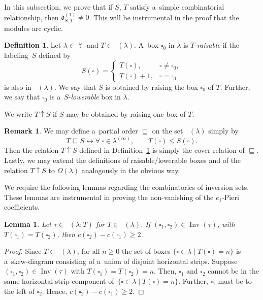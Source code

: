 \documentclass[10pt,a4paper]{amsart}
\numberwithin{equation}{section}
\newtheorem{Lemma}[Theorem]{Lemma}
\theoremstyle{definition}
\newtheorem{Definition}[Theorem]{Definition}
\newtheorem{Remark}[Theorem]{Remark}
\DeclareMathOperator{\Par}{\mathbb{Y}}
\DeclareMathOperator{\PSYT}{\mathrm{PSYT}_{\geq 0}}
\DeclareMathOperator{\RSSYT}{\mathrm{RSSYT}_{\geq 0}}
\DeclareMathOperator{\Inv}{\mathrm{Inv}}
\begin{document}
In this subsection, we prove that if $S$, $T$ satisfy a~simple combinatorial relationship, then $\mathfrak{d}_{S,T}^{(1)} \neq 0$. This will be instrumental in the proof that the modules  are cyclic.

\begin{Definition}\label{raising definition}
 Let $\lambda \in \Par$ and $T \in \RSSYT(\lambda)$. A~box $\square_0$ in $\lambda$ is $T$-\textit{\textit{raisable}} if the labeling~$S$ defined by
 \[
 S(\square) = \begin{cases}
 T(\square), & \square \neq \square_0, \\
 T(\square)+1 ,& \square = \square_0
 \end{cases}
 \]
 is also in $\RSSYT(\lambda)$. We say that $S$ is obtained by raising the box $\square_0$ of $T$. Further, we say that $\square_0$ is a~$S$-\textit{\textit{lowerable}} box in $\lambda$.

 We write $T \uparrow S$ if $S$ may be obtained by raising one box of $T$.
\end{Definition}

\begin{Remark}
 We may define a~partial order $\sqsubseteq$ on the set $\RSSYT(\lambda)$ simply by
 \[
 T \sqsubseteq S \leftrightarrow \forall ~\square \in \lambda^{(\infty)}, \qquad T(\square) \leq S(\square).
 \]
 Then the relation $T \uparrow S$ defined in Definition~\ref{raising definition} is simply the cover relation of $\sqsubseteq$.
 Lastly, we may extend the definitions of raisable/lowerable boxes and of the relation $T \uparrow S$ to $\Omega(\lambda)$ analogously in the obvious way.
\end{Remark}

We require the following lemmas regarding the combinatorics of inversion sets. These lemmas are instrumental in proving the non-vanishing of the $e_1$-Pieri coefficients.

\begin{Lemma}\label{gaps between contents}
 Let $\tau \in \PSYT(\lambda;T)$ for $T\in \RSSYT(\lambda)$. If $(\square_1,\square_2)\in \Inv(\tau)$, with $T(\square_1)=T(\square_2)$, then $c(\square_2)-c(\square_1) \geq 2$.
\end{Lemma}

\begin{proof}
 Since $T \in \RSSYT(\lambda)$, for all $n \geq 0$ the set of boxes $\{\square \in \lambda \mid T(\square) = n\}$ is a~skew-diagram consisting of a~union of disjoint horizontal strips. Suppose $(\square_1,\square_2) \in \Inv(\tau)$ with $T(\square_1)=T(\square_2) = n$. Then, $\square_1$ and $\square_2$ cannot be in the same horizontal strip component of~${\{\square \in \lambda \mid T(\square) = n\}}$. Further, $\square_1$ must be to the left of $\square_2$. Hence, $c(\square_2)-c(\square_1) \geq 2$.
\end{proof}
\end{document}
